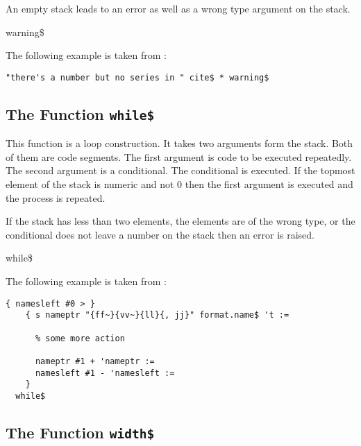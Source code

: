 An empty stack leads to an error as well as a wrong type argument on
the stack.

\begin{BstFunction}{warning\$}
\end{BstFunction}

The following example is taken from :

\begin{lstlisting}[language=bst]
  "there's a number but no series in " cite$ * warning$ 
\end{lstlisting}%


\subsection{The Function \texttt{while\$}}%

This function is a loop construction. It takes two arguments form the
stack. Both of them are code segments. The first argument is code to
be executed repeatedly. The second argument is a conditional. The
conditional is executed. If the topmost element of the stack is
numeric and not 0 then the first argument is executed and the process
is repeated.

If the stack has less than two elements, the elements are of the
wrong type, or the conditional does not leave a number on the stack
then an error is raised.

\begin{BstFunction}{while\$}
\end{BstFunction}

The following example is taken from :

\begin{lstlisting}[language=bst]
    { namesleft #0 > }
    { s nameptr "{ff~}{vv~}{ll}{, jj}" format.name$ 't :=

      % some more action

      nameptr #1 + 'nameptr :=
      namesleft #1 - 'namesleft :=
    }
  while$
\end{lstlisting}%
\fctIndex{+}\fctIndex{-}\fctIndex{>}%
\fctIndex{:=}


\subsection{The Function \texttt{width\$}}%

